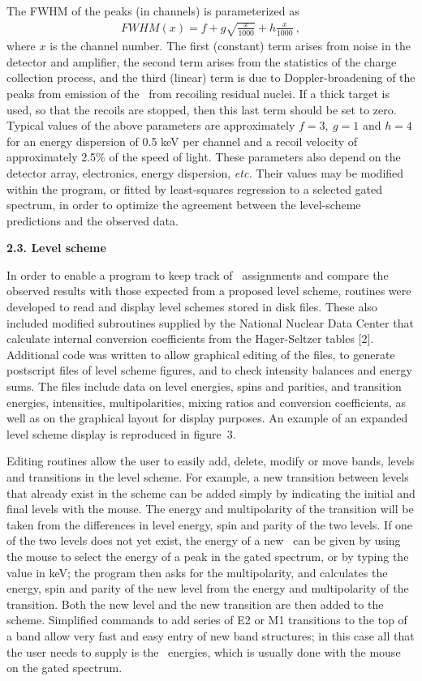 The FWHM of the peaks (in channels) is parameterized as
\begin{eqnarray}
 FWHM(x) = f + g \sqrt{\frac{x}{1000}} + h \frac{x}{1000} \ ,   \label{eq:fwhm}
\end{eqnarray}
where $x$ is the channel number. The first (constant) term arises from noise in
the detector and amplifier, the second term arises from the statistics of the
charge collection process, and the third (linear) term is due to
Doppler-broadening of the peaks from emission of the \grays\ from recoiling
residual nuclei. If a thick target is used, so that the recoils are stopped,
then this last term should be set to zero. Typical values of the above
parameters are approximately $f=3, \ g=1$ and $h=4$ for an energy dispersion of
0.5 keV per channel and a recoil velocity of approximately 2.5\% of the speed
of light. These parameters also depend on the detector array, electronics,
energy dispersion, {\em etc.} Their values may be modified within the program,
or fitted by least-squares regression to a selected gated spectrum, in order to
optimize the agreement between the level-scheme predictions and the observed
data.

\noindent
{\bf 2.3. Level scheme}

In order to enable a program to keep track of \ghray\ assignments and compare
the observed results with those expected from a proposed level scheme, routines
were developed to read and display level schemes stored in disk files. These
also included modified subroutines supplied by the National Nuclear Data Center
that calculate internal conversion coefficients from the Hager-Seltzer tables
[2]. Additional code was written to allow graphical editing of the files, to
generate postscript files of level scheme figures, and to check intensity
balances and energy sums. The files include data on level energies, spins and
parities, and transition energies, intensities, multipolarities, mixing ratios
and conversion coefficients, as well as on the graphical layout for display
purposes. An example of an expanded level scheme display is reproduced in
figure~3.

Editing routines allow the user to easily add, delete, modify or move bands,
levels and transitions in the level scheme. For example, a new transition
between levels that already exist in the scheme can be added simply by
indicating the initial and final levels with the mouse. The energy and
multipolarity of the transition will be taken from the differences in level
energy, spin and parity of the two levels. If one of the two levels does not
yet exist, the energy of a new \gray\ can be given by using the mouse to select
the energy of a peak in the gated spectrum, or by typing the value in keV; the
program then asks for the multipolarity, and calculates the energy, spin and
parity of the new level from the energy and multipolarity of the transition.
Both the new level and the new transition are then added to the scheme.
Simplified commands to add series of E2 or M1 transitions to the top of a band
allow very fast and easy entry of new band structures; in this case all that
the user needs to supply is the \ghray\ energies, which is usually done with
the mouse on the gated spectrum.


